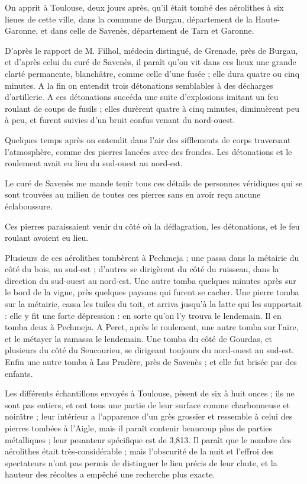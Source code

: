 \documentclass[a4paper, 12pt, oneside, french]{article}
\begin{document}
\og On apprit à Toulouse, deux jours après, qu'il était tombé des aérolithes à six lieues de cette ville, dans la commune de Burgau, département de la Haute-Garonne, et dans celle de Savenès, département de Tarn et Garonne. \fg

\og D'après le rapport de M. Filhol, médecin distingué, de Grenade, près de Burgau, et d'après celui du curé de Savenès, il paraît qu'on vit dans ces lieux une grande clarté permanente, blanchâtre, comme celle d'une fusée ; elle dura quatre ou cinq minutes. A la fin on entendit trois détonations semblables à des décharges d'artillerie. A ces détonations succéda une suite d'explosions imitant un feu roulant de coups de fusils ; elles durèrent quatre à cinq minutes, diminuèrent peu à peu, et furent suivies d'un bruit confus venant du nord-ouest. \fg

\og Quelques temps après on entendit dans l'air des sifflements de corps traversant l'atmosphère, comme des pierres lancées avec des frondes. Les détonations et le roulement avait eu lieu du sud-ouest au nord-est. \fg

\og Le curé de Savenès me mande tenir tous ces détails de personnes véridiques qui se sont trouvées au milieu de toutes ces pierres sans en avoir reçu aucune éclaboussure. \fg

\og Ces pierres paraissaient venir du côté où la déflagration, les détonations, et le feu roulant avoient eu lieu. \fg

\og Plusieurs de ces aérolithes tombèrent à Pechmeja ; une passa dans la métairie du côté du bois, au sud-est ; d'autres se dirigèrent du côté du ruisseau, dans la direction du sud-ouest au nord-est. Une autre tomba quelques minutes après sur le bord de la vigne, près quelques paysans qui furent se cacher. Une pierre tomba sur la métairie, cassa les tuiles du toit, et arriva jusqu'à la latte qui les supportait : elle y fit une forte dépression : en sorte qu'on l'y trouva le lendemain. Il en tomba deux à Pechmeja. A Peret, après le roulement, une autre tomba sur l'aire, et le métayer la ramassa le lendemain. Une tomba du côté de Gourdas, et plusieurs du côté du Seucourieu, se dirigeant toujours du nord-ouest au sud-est. Enfin une autre tomba à Las Pradère, près de Savenès ; et elle fut brisée par des enfants. \fg

\og Les différents échantillons envoyés à Toulouse, pèsent de six à huit onces ; ils ne sont pas entiers, et ont tous une partie de leur surface comme charbonneuse et noirâtre ; leur intérieur a l'apparence d'un grès grossier et ressemble à celui des pierres tombées à l'Aigle, mais il paraît contenir beaucoup plus de parties métalliques ; leur pesanteur spécifique est de 3,813. Il paraît que le nombre des aérolithes était très-considérable ; mais l'obscurité de la nuit et l'effroi des spectateurs n'ont pas permis de distinguer le lieu précis de leur chute, et la hauteur des récoltes a empêché une recherche plus exacte. \fg
\end{document}
